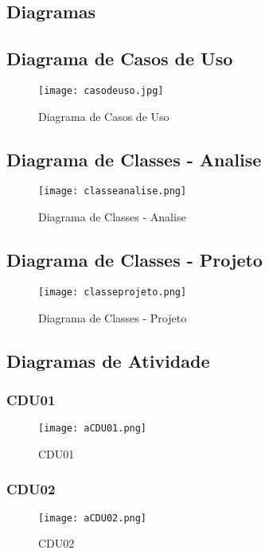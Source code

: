 \begin{landscape}
\section{Diagramas}\label{diagramas}

\subsection{Diagrama de Casos de Uso}
\begin{figure}[htb]
	\centering
	\texttt{[image: casodeuso.jpg]}
	\caption{Diagrama de Casos de Uso}
\end{figure}
\clearpage

\subsection{Diagrama de Classes - Analise}
\begin{figure}[htb]
	\centering
	\texttt{[image: classeanalise.png]}
	\caption{Diagrama de Classes - Analise}
\end{figure}
\clearpage

\subsection{Diagrama de Classes - Projeto}
\begin{figure}[htb]
	\centering
	\texttt{[image: classeprojeto.png]}
	\caption{Diagrama de Classes - Projeto}
\end{figure}
\clearpage

\subsection{Diagramas de Atividade}
\subsubsection{CDU01}
\begin{figure}[htb]
	\centering
	\texttt{[image: aCDU01.png]}
	\caption{CDU01}
\end{figure}
\clearpage
%
\subsubsection{CDU02}
\begin{figure}[htb]
	\centering
	\texttt{[image: aCDU02.png]}
	\caption{CDU02}
\end{figure}
\clearpage
%

\end{landscape}
